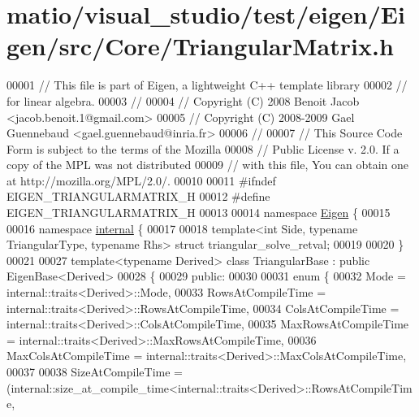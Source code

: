 \hypertarget{matio_2visual__studio_2test_2eigen_2_eigen_2src_2_core_2_triangular_matrix_8h_source}{}\section{matio/visual\+\_\+studio/test/eigen/\+Eigen/src/\+Core/\+Triangular\+Matrix.h}
\label{matio_2visual__studio_2test_2eigen_2_eigen_2src_2_core_2_triangular_matrix_8h_source}

\begin{DoxyCode}
00001 \textcolor{comment}{// This file is part of Eigen, a lightweight C++ template library}
00002 \textcolor{comment}{// for linear algebra.}
00003 \textcolor{comment}{//}
00004 \textcolor{comment}{// Copyright (C) 2008 Benoit Jacob <jacob.benoit.1@gmail.com>}
00005 \textcolor{comment}{// Copyright (C) 2008-2009 Gael Guennebaud <gael.guennebaud@inria.fr>}
00006 \textcolor{comment}{//}
00007 \textcolor{comment}{// This Source Code Form is subject to the terms of the Mozilla}
00008 \textcolor{comment}{// Public License v. 2.0. If a copy of the MPL was not distributed}
00009 \textcolor{comment}{// with this file, You can obtain one at http://mozilla.org/MPL/2.0/.}
00010 
00011 \textcolor{preprocessor}{#ifndef EIGEN\_TRIANGULARMATRIX\_H}
00012 \textcolor{preprocessor}{#define EIGEN\_TRIANGULARMATRIX\_H}
00013 
00014 \textcolor{keyword}{namespace }\hyperlink{namespace_eigen}{Eigen} \{ 
00015 
00016 \textcolor{keyword}{namespace }\hyperlink{namespaceinternal}{internal} \{
00017   
00018 \textcolor{keyword}{template}<\textcolor{keywordtype}{int} S\textcolor{keywordtype}{id}e, \textcolor{keyword}{typename} TriangularType, \textcolor{keyword}{typename} Rhs> \textcolor{keyword}{struct }triangular\_solve\_retval;
00019   
00020 \}
00021 
00027 \textcolor{keyword}{template}<\textcolor{keyword}{typename} Derived> \textcolor{keyword}{class }TriangularBase : \textcolor{keyword}{public} EigenBase<Derived>
00028 \{
00029   \textcolor{keyword}{public}:
00030 
00031     \textcolor{keyword}{enum} \{
00032       Mode = internal::traits<Derived>::Mode,
00033       RowsAtCompileTime = internal::traits<Derived>::RowsAtCompileTime,
00034       ColsAtCompileTime = internal::traits<Derived>::ColsAtCompileTime,
00035       MaxRowsAtCompileTime = internal::traits<Derived>::MaxRowsAtCompileTime,
00036       MaxColsAtCompileTime = internal::traits<Derived>::MaxColsAtCompileTime,
00037       
00038       SizeAtCompileTime = (internal::size\_at\_compile\_time<internal::traits<Derived>::RowsAtCompileTime,

\end{DoxyCode}
